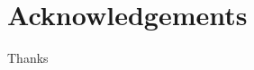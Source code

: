 \documentclass[../master.tex]{subfiles}
\begin{document}
\chapter*{Acknowledgements}
Thanks

\end{document}

